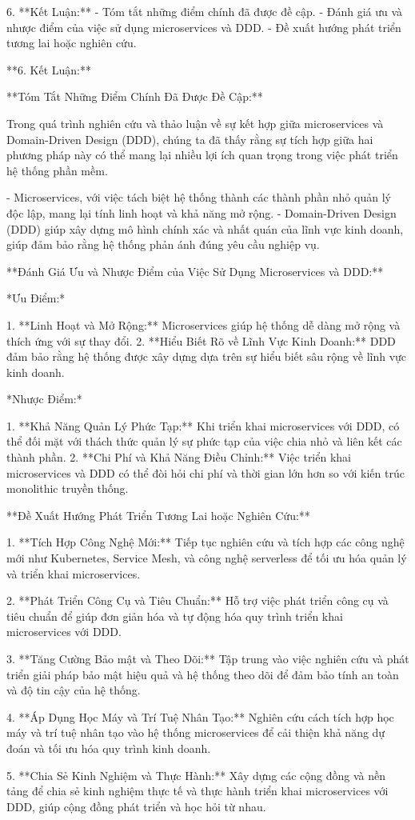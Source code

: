 

6. **Kết Luận:**
   - Tóm tắt những điểm chính đã được đề cập.
   - Đánh giá ưu và nhược điểm của việc sử dụng microservices và DDD.
   - Đề xuất hướng phát triển tương lai hoặc nghiên cứu.







**6. Kết Luận:**

**Tóm Tắt Những Điểm Chính Đã Được Đề Cập:**

Trong quá trình nghiên cứu và thảo luận về sự kết hợp giữa microservices và Domain-Driven Design (DDD), chúng ta đã thấy rằng sự tích hợp giữa hai phương pháp này có thể mang lại nhiều lợi ích quan trọng trong việc phát triển hệ thống phần mềm.

- Microservices, với việc tách biệt hệ thống thành các thành phần nhỏ quản lý độc lập, mang lại tính linh hoạt và khả năng mở rộng.
- Domain-Driven Design (DDD) giúp xây dựng mô hình chính xác và nhất quán của lĩnh vực kinh doanh, giúp đảm bảo rằng hệ thống phản ánh đúng yêu cầu nghiệp vụ.

**Đánh Giá Ưu và Nhược Điểm của Việc Sử Dụng Microservices và DDD:**

*Ưu Điểm:*

1. **Linh Hoạt và Mở Rộng:** Microservices giúp hệ thống dễ dàng mở rộng và thích ứng với sự thay đổi.
2. **Hiểu Biết Rõ về Lĩnh Vực Kinh Doanh:** DDD đảm bảo rằng hệ thống được xây dựng dựa trên sự hiểu biết sâu rộng về lĩnh vực kinh doanh.

*Nhược Điểm:*

1. **Khả Năng Quản Lý Phức Tạp:** Khi triển khai microservices với DDD, có thể đối mặt với thách thức quản lý sự phức tạp của việc chia nhỏ và liên kết các thành phần.
2. **Chi Phí và Khả Năng Điều Chỉnh:** Việc triển khai microservices và DDD có thể đòi hỏi chi phí và thời gian lớn hơn so với kiến trúc monolithic truyền thống.

**Đề Xuất Hướng Phát Triển Tương Lai hoặc Nghiên Cứu:**

1. **Tích Hợp Công Nghệ Mới:** Tiếp tục nghiên cứu và tích hợp các công nghệ mới như Kubernetes, Service Mesh, và công nghệ serverless để tối ưu hóa quản lý và triển khai microservices.
   
2. **Phát Triển Công Cụ và Tiêu Chuẩn:** Hỗ trợ việc phát triển công cụ và tiêu chuẩn để giúp đơn giản hóa và tự động hóa quy trình triển khai microservices với DDD.

3. **Tăng Cường Bảo mật và Theo Dõi:** Tập trung vào việc nghiên cứu và phát triển giải pháp bảo mật hiệu quả và hệ thống theo dõi để đảm bảo tính an toàn và độ tin cậy của hệ thống.

4. **Áp Dụng Học Máy và Trí Tuệ Nhân Tạo:** Nghiên cứu cách tích hợp học máy và trí tuệ nhân tạo vào hệ thống microservices để cải thiện khả năng dự đoán và tối ưu hóa quy trình kinh doanh.

5. **Chia Sẻ Kinh Nghiệm và Thực Hành:** Xây dựng các cộng đồng và nền tảng để chia sẻ kinh nghiệm thực tế và thực hành triển khai microservices với DDD, giúp cộng đồng phát triển và học hỏi từ nhau.


 
